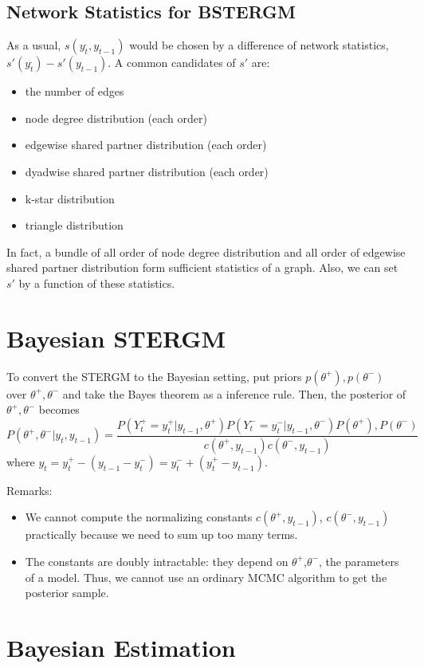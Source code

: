 \documentclass[aspectratio=169,ignorenonframetext,9pt]{beamer}
\theoremstyle{plain}
\theoremstyle{definition}
\begin{document}
\subsection{Network Statistics for BSTERGM}
As a usual, $s(y_{t}^.,y_{t-1})$ would be chosen by a difference of network statistics, $s'(y_t^.)-s'(y_{t-1})$.
A common candidates of $s'$ are:
\begin{itemize}
    \item the number of edges
    \item node degree distribution (each order)
    \item edgewise shared partner distribution (each order)
    \item dyadwise shared partner distribution (each order)
    \item k-star distribution
    \item triangle distribution
\end{itemize}
In fact, a bundle of all order of node degree distribution and all order of edgewise shared partner distribution form sufficient statistics of a graph.
Also, we can set $s'$ by a function of these statistics.


\section{Bayesian STERGM}

To convert the STERGM to the Bayesian setting, put priors $p(\theta^+),p(\theta^-)$ over $\theta^+,\theta^-$ and take the Bayes theorem as a inference rule.
Then, the posterior of $\theta^+,\theta^-$ becomes
\[P(\theta^+,\theta^-|y_t, y_{t-1}) = \frac{P(Y_t^+=y_t^+|y_{t-1},\theta^+) P(Y_t^-=y_t^-|y_{t-1},\theta^-)P(\theta^+),P(\theta^-)}{c(\theta^+,y_{t-1})c(\theta^-,y_{t-1})} \]
where $y_t=y_t^+ - (y_{t-1} - y_t^-) = y_t^- + (y_t^+ - y_{t-1})$.

Remarks:
\begin{itemize}
    \item We cannot compute the normalizing constants $c(\theta^+,y_{t-1})$, $c(\theta^-,y_{t-1})$ practically because we need to sum up too many terms.
    \item The constants are doubly intractable: they depend on $\theta^+$,$\theta^-$, the parameters of a model.
        Thus, we cannot use an ordinary MCMC algorithm to get the posterior sample.
\end{itemize}


\section{Bayesian Estimation}
\end{document}
